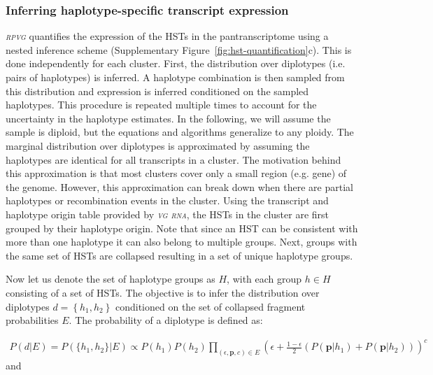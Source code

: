 \documentclass[11pt]{ucthesis}
\newcommand{\tool}[1]{\emph{\textsc{#1}}}
\begin{document}
\subsubsection{Inferring haplotype-specific transcript expression}

\tool{rpvg} quantifies the expression of the HSTs in the pantranscriptome using a nested inference scheme (Supplementary Figure~\ref{fig:hst-quantification}c). This is done independently for each cluster. First, the distribution over diplotypes (i.e. pairs of haplotypes) is inferred. A haplotype combination is then sampled from this distribution and expression is inferred conditioned on the sampled haplotypes. This procedure is repeated multiple times to account for the uncertainty in the haplotype estimates. In the following, we will assume the sample is diploid, but the equations and algorithms generalize to any ploidy.
\newline 
\newline
The marginal distribution over diplotypes is approximated by assuming the haplotypes are identical for all transcripts in a cluster. The motivation behind this approximation is that most clusters cover only a small region (e.g. gene) of the genome. However, this approximation can break down when there are partial haplotypes or recombination events in the cluster. Using the transcript and haplotype origin table provided by \tool{vg rna}, the HSTs in the cluster are first grouped by their haplotype origin. Note that since an HST can be consistent with more than one haplotype it can also belong to multiple groups. Next, groups with the same set of HSTs are collapsed resulting in a set of unique haplotype groups. 

Now let us denote the set of haplotype groups as $H$, with each group ${h \in H}$ consisting of a set of HSTs. The objective is to infer the distribution over diplotypes ${d=\left\{h_1,h_2\right\}}$ conditioned on the set of collapsed fragment probabilities $E$. The probability of a diplotype is defined as:

\begin{align}
    P(d|E)=P(\{h_1,h_2\}|E)\propto P(h_1)P(h_2)\prod_{\left(\epsilon, \textbf{p}, c\right) \in E}\left(\epsilon+\frac{1-\epsilon}{2}\left(P(\textbf{p}|h_1)+P(\textbf{p}|h_2)\right)\right)^c
\end{align}
\noindent and
\end{document}
